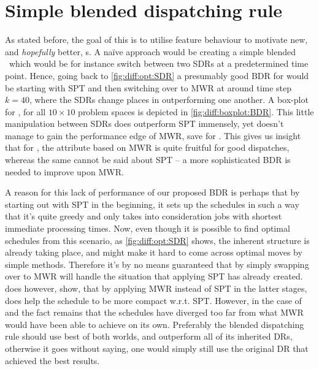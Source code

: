 \section{Simple blended dispatching rule}\label{sec:diff:opt:bdr}
As stated before, the goal of this  is to 
utilise feature behaviour to motivate new, and \emph{hopefully} better, 
\dr s. 
A na\"ive approach would be creating a simple blended \dr\ which 
would be for instance switch between two SDRs at a predetermined time point. 
Hence, going back to \cref{fig:diff:opt:SDR} a presumably good BDR for 
  would be starting with SPT and then switching over to MWR at 
around time step $k=40$, where the SDRs change places in outperforming one 
another. A box-plot for \namerho, for all $10\times10$ problem spaces is 
depicted in \cref{fig:diff:boxplot:BDR}. This little manipulation between SDRs 
does outperform SPT immensely, yet doesn't manage to gain the performance edge 
of MWR, save for . This gives us insight that for \jsp, the 
attribute based on MWR is quite fruitful for good dispatches, whereas the same 
cannot be said about SPT -- a more sophisticated BDR is needed to improve upon 
MWR. 

A reason for this lack of performance of our proposed BDR is perhaps that by 
starting out with SPT in the beginning, it sets up the schedules in such a way 
that it's quite greedy and only takes into consideration jobs with shortest 
immediate processing times. Now, even though it is possible to find optimal 
schedules from this scenario, as \cref{fig:diff:opt:SDR} shows, the inherent 
structure is already taking place, and might make it hard to come across 
optimal moves by simple methods. Therefore it's by no means guaranteed that by 
simply swapping over to MWR will handle the situation that applying SPT has 
already created.  does however, show, that by 
applying MWR instead of SPT in the latter stages, does help the schedule to be 
more compact w.r.t. SPT. However, in the case of  and 
 the fact remains that the schedules have diverged too far from 
what MWR would have been able to achieve on its own. Preferably the blended 
dispatching rule should use  best of both worlds, and outperform all of its 
inherited DRs, otherwise it goes without saying, one would simply still use the 
original DR that achieved the best results.

